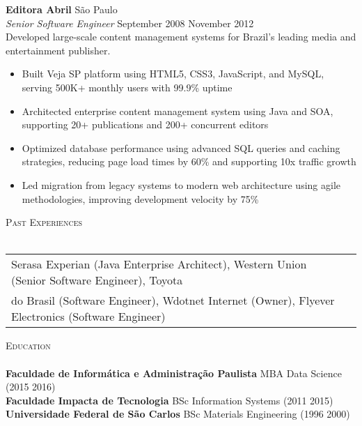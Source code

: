 \documentclass[a4paper]{article}
\newcommand{\lineunder} {
    \vspace*{-8pt} \\
    \hspace*{-18pt} \hrulefill \\
}
\newcommand{\header} [1] {
    {\hspace*{-18pt}\vspace*{6pt} \textsc{#1}}
    \vspace*{-6pt} \lineunder
}
\begin{document}
\textbf{Editora Abril}                        \hfill São Paulo              \\
\textit{Senior Software Engineer} \hfill September 2008 \raisebox{0.2ex}{\scalebox{0.8}{$\sim$}} November 2012     \\
\vspace{0.5mm}
Developed large-scale content management systems for Brazil's leading media and entertainment publisher.
\vspace{-2mm}
\begin{itemize}
\setlength\itemsep{-1mm}
\item Built Veja SP platform using HTML5, CSS3, JavaScript, and MySQL, serving 500K+ monthly users with 99.9\% uptime
\item Architected enterprise content management system using Java and SOA, supporting 20+ publications and 200+ concurrent editors
\item Optimized database performance using advanced SQL queries and caching strategies, reducing page load times by 60\% and supporting 10x traffic growth
\item Led migration from legacy systems to modern web architecture using agile methodologies, improving development velocity by 75\%
\end{itemize}

\header{Past Experiences}
\vspace{0.75mm}
\begin{tabular}{ @{}l l }
    Serasa Experian (Java Enterprise Architect), Western Union (Senior Software Engineer), Toyota \\ do Brasil (Software Engineer), Wdotnet Internet (Owner), Flyever Electronics (Software Engineer) \\
\end{tabular}

\header{Education}
\vspace{0.5mm}
\textbf{Faculdade de Informática e Administração Paulista} \hfill MBA Data Science (2015 \raisebox{0.2ex}{\scalebox{0.8}{$\sim$}} 2016) \\
\textbf{Faculdade Impacta de Tecnologia} \hfill BSc Information Systems (2011 \raisebox{0.2ex}{\scalebox{0.8}{$\sim$}} 2015) \\
\textbf{Universidade Federal de São Carlos} \hfill BSc Materials Engineering (1996 \raisebox{0.2ex}{\scalebox{0.8}{$\sim$}} 2000) \\
\vspace{0.5mm}
\end{document}
